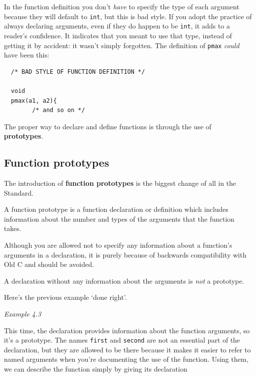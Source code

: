    In the function definition you don't \textit{have} to specify the type
    of each argument because they will default to \texttt{int}, but this
    is bad style. If you adopt the practice of always declaring arguments,
    even if they do happen to be \texttt{int}, it adds to a reader's
    confidence. It indicates that you meant to use that type, instead of
    getting it by accident: it wasn't simply forgotten. The definition of
    \texttt{pmax} \textit{could} have been this:

\begin{Verbatim}
  /* BAD STYLE OF FUNCTION DEFINITION */

  void
  pmax(a1, a2){
        /* and so on */
\end{Verbatim}

   The proper way to declare and define functions is through the use of
    \textbf{prototypes}.


  

  \subsection{Function prototypes}
   

   The introduction of \textbf{function prototypes} is the biggest
    change of all in the Standard.


   A function prototype is a function declaration or definition which
    includes information about the number and types of the arguments that
    the function takes.


   Although you are allowed not to specify any information about a
    function's arguments in a declaration, it is purely because of backwards
    compatibility with Old C and should be avoided.


   A declaration without any information about the arguments is
    \textit{not} a prototype.


   Here's the previous example `done right'.


\begin{center}\textit{Example 4.3}\end{center}

   This time, the declaration provides information about the function
    arguments, so it's a prototype. The names \texttt{first} and
    \texttt{second} are not an essential part of the declaration, but
    they are allowed to be there because it makes it easier to refer to
    named arguments when you're documenting the use of the function. Using
    them, we can describe the function simply by giving its declaration

